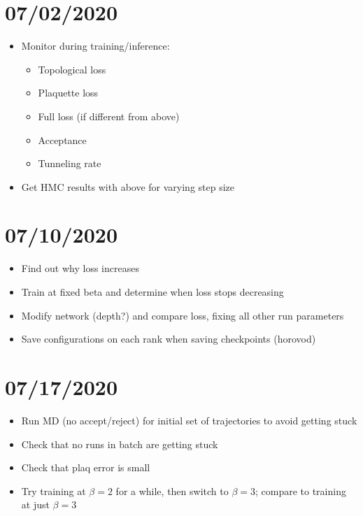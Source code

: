 \section{07/02/2020}
\begin{itemize}
  \item Monitor during training/inference:
    \begin{itemize}
      \item Topological loss
      \item Plaquette loss
      \item Full loss (if different from above)
      \item Acceptance
      \item Tunneling rate
    \end{itemize}
  \item Get HMC results with above for varying step size
\end{itemize}

\section{07/10/2020}
\begin{itemize}
  \item Find out why loss increases
  \item Train at fixed beta and determine when loss stops decreasing
  \item Modify network (depth?) and compare loss, fixing all other run
    parameters
  \item Save configurations on each rank when saving checkpoints (horovod)
\end{itemize}

\section{07/17/2020}
\begin{itemize}
  \item Run MD (no accept/reject) for initial set of trajectories to avoid
    getting stuck
  \item Check that no runs in batch are getting stuck
  \item Check that plaq error is small
  \item Try training at \(\beta = 2\) for a while, then switch to \(\beta
    = 3\); compare to training at just \(\beta = 3\)
\end{itemize}

